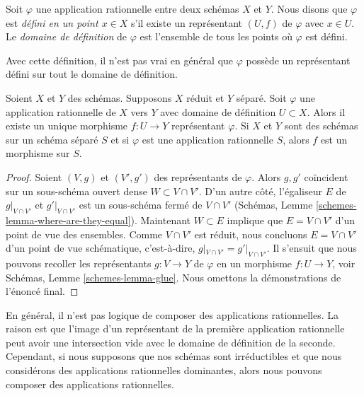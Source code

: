 \begin{definition}
\label{definition-domain-of-definition}
Soit $\varphi$ une application rationnelle entre deux schémas $X$ et $Y$. Nous disons
que $\varphi$ est {\it défini en un point $x \in X$} s'il
existe un représentant $(U, f)$ de $\varphi$ avec $x \in U$. Le {\it
domaine de définition} de $\varphi$ est l'ensemble de tous les
points où $\varphi$ est défini.
\end{definition}

\noindent
Avec cette définition, il n'est pas vrai en général que $\varphi$
possède un représentant défini sur tout le domaine de définition.

\begin{lemma}
\label{lemma-rational-map-from-reduced-to-separated}
Soient $X$ et $Y$ des schémas. Supposons $X$ réduit et $Y$ séparé.
Soit $\varphi$ une application rationnelle de $X$ vers $Y$ avec domaine de
définition $U \subset X$. Alors il existe un unique morphisme $f : U \to Y$ représentant $\varphi$.
Si $X$ et $Y$ sont des schémas sur un schéma séparé $S$ et
si $\varphi$ est une application rationnelle $S$, alors $f$ est un morphisme
sur $S$.
\end{lemma}

\begin{proof}
Soient $(V, g)$ et $(V', g')$ des représentants de $\varphi$.
Alors $g, g'$ coïncident sur un sous-schéma ouvert dense
$W \subset V \cap V'$. D'un autre côté, l'égaliseur $E$ de $g|_{V \cap V'}$ et $g'|_{V \cap V'}$
est un sous-schéma fermé de $V \cap V'$ (Schémas,
Lemme \ref{schemes-lemma-where-are-they-equal}). Maintenant $W \subset E$ implique que
$E = V \cap V'$ d'un point de vue des ensembles. Comme $V \cap V'$
est réduit, nous concluons $E = V \cap V'$ d'un point de vue schématique,
c'est-à-dire, $g|_{V \cap V'} = g'|_{V \cap V'}$. Il s'ensuit que nous pouvons recoller
les représentants $g : V \to Y$ de $\varphi$ en un morphisme $f : U \to Y$,
voir Schémas, Lemme \ref{schemes-lemma-glue}. Nous
omettons la démonstrations de l'énoncé final.
\end{proof}

\noindent
En général, il n'est pas logique de composer des applications rationnelles. La raison est
que l'image d'un représentant de la première application rationnelle peut avoir une intersection
vide avec le domaine de définition de la seconde. Cependant, si nous supposons
que nos schémas sont irréductibles et que nous considérons des applications rationnelles
dominantes, alors nous pouvons composer des applications rationnelles.

